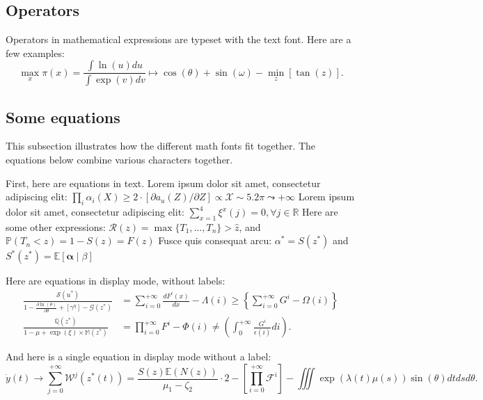 \documentclass{article}
\begin{document}
\subsection{Operators} 

Operators in mathematical expressions are typeset with the text font. Here are a few examples: 
\[

\max_x \pi(x) = \frac{\int \ln(u)du}{\int\exp(v) dv} \mapsto \cos(\theta) + \sin(\omega) - \min_z[\tan(z)].

\]
 \wcTpLoremIpsum*[type=sentence,words-per-sentence=39,seed=120]{}  

\subsection{Some equations} 

This subsection illustrates how the different math fonts fit together. The equations below combine various characters together.

First, here are equations in text. Lorem ipsum dolor sit amet, consectetur adipiscing elit: $\prod_i\alpha_i(X) \geq 2 \cdot [\partial a_u(Z)/\partial Z] \propto \mathcal{X} \sim 5.2\pi \leadsto +\infty$ Lorem ipsum dolor sit amet, consectetur adipiscing elit: $\sum_{x=1}^4 \xi^x(j)=0,   \forall j\in \mathbb{R}$ Here are some other expressions: $\mathcal{R}(z) = \max\{T_1,\ldots,T_{n}\} > \hat{z}$, and  $\mathbb{P}(T_n < z) = 1 - S(z) = F(z)$ \wcTpLoremIpsum*[type=sentence,words-per-sentence=9,seed=121]{}  Fusce quis consequat arcu: $\alpha^* = S(z^*)$ and $S^*(z^*)=\mathbb{E}[\boldsymbol{\alpha}\mid \beta]$ \wcTpLoremIpsum*[type=sentence,words-per-sentence=14,seed=122]{} 

Here are equations in display mode, without labels:
\[
\begin{aligned}
\frac{\mathcal{S}(u^*)}{1 - \frac{\partial \ln(\theta)}{\partial \theta} + \left[\gamma^\eta\right] - \mathcal{G}(z^*)} &= \sum_{i=0}^{+\infty}\frac{d F^{i}(x)}{d x} - \Lambda(i) \geq \left\lbrace\sum_{i=0}^{+\infty}G^{i} - \Omega(i)\right\rbrace\\
\frac{\mathbb{Q}(z^*)}{1 -\mu + \exp(\xi) \times \mathbb{M}(z^*)} &= \prod_{i=0}^{+\infty}F^{i} - \Phi(i) \neq \left(\int_{0}^{+\infty}\frac{G^{i}}{\epsilon(i)} di\right).
\end{aligned}
\]
 \wcTpLoremIpsum*[type=sentence,words-per-sentence=35,seed=123]{} 

And here is a single equation in display mode without a label:
\[

\dot{y}(t) \to \sum_{j=0}^{+\infty}\mathcal{W}^j(z^{\ast}(t)) = \frac{S(z) \mathbb{E}(N(z))}{\mu_1 - \zeta_2} \cdot 2 - \left[\prod_{i=0}^{+\infty}\mathcal{F}^{i}\right]-\iiint\exp(\lambda(t) \mu(s)) \sin(\theta)dt ds d\theta.

\]
 \wcTpLoremIpsum*[type=sentence,words-per-sentence=29,seed=124]{} 
\end{document}
